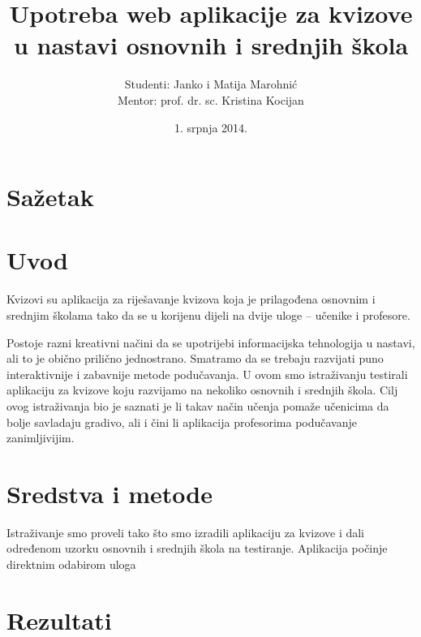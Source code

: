 \documentclass{scrreprt}
\begin{document}
\titlehead{Sveučilište u Zagrebu\\Filozofski fakultet\\Odsijek za informacijske
i komunikacijske znanosti\\Akademska godina 2013/14.}

\title{Upotreba web aplikacije za kvizove u nastavi osnovnih i srednjih škola}

\author{Studenti: Janko i Matija Marohnić\\Mentor: prof. dr. sc. Kristina
Kocijan}

\date{1. srpnja 2014.}

\maketitle
\tableofcontents

\chapter{Sažetak}

\chapter{Uvod}

Kvizovi su aplikacija za riješavanje kvizova koja je prilagođena osnovnim i
srednjim školama tako da se u korijenu dijeli na dvije uloge -- učenike i
profesore.

Postoje razni kreativni načini da se upotrijebi informacijska tehnologija u
nastavi, ali to je obično prilično jednostrano. Smatramo da se trebaju razvijati
puno interaktivnije i zabavnije metode podučavanja. U ovom smo istraživanju
testirali aplikaciju za kvizove koju razvijamo na nekoliko osnovnih i srednjih
škola. Cilj ovog istraživanja bio je saznati je li takav način učenja pomaže
učenicima da bolje savladaju gradivo, ali i čini li aplikacija profesorima
podučavanje zanimljivijim.

\chapter{Sredstva i metode}

Istraživanje smo proveli tako što smo izradili aplikaciju za kvizove i dali
određenom uzorku osnovnih i srednjih škola na testiranje. Aplikacija počinje
direktnim odabirom uloga \cite{lamport94}

\chapter{Rezultati}
\end{document}

